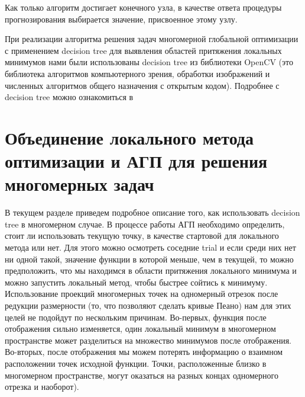 \documentclass{svproc}
\begin{document}
Как только алгоритм достигает конечного узла, в качестве ответа процедуры прогнозирования выбирается значение, присвоенное этому узлу.

При реализации алгоритма  решения задач многомерной глобальной оптимизации с применением decision tree для выявления областей притяжения локальных минимумов нами были использованы  decision tree из библиотеки OpenCV (это библиотека алгоритмов компьютерного зрения, обработки изображений и численных алгоритмов общего назначения с открытым кодом). Подробнее с decision tree можно ознакомиться в \cite{fio_bib16}


\section{Объединение локального метода оптимизации и АГП для решения многомерных задач}

В текущем разделе приведем подробное описание того, как использовать decision tree в многомерном случае. В процессе работы АГП необходимо определить, стоит ли использовать текущую точку, в качестве стартовой для локального метода или нет. Для этого можно осмотреть соседние trial и если среди них нет ни одной такой, значение функции в которой меньше, чем в текущей, то можно предположить, что мы находимся в области притяжения локального минимума и можно запустить локальный метод, чтобы быстрее сойтись к минимуму. Использование проекций многомерных точек на одномерный отрезок после редукции размерности (то, что позволяют сделать кривые Пеано) нам для этих целей не подойдут по нескольким причинам. Во-первых, функция после отображения сильно изменяется, один локальный минимум в многомерном пространстве может разделиться на множество минимумов после отображения. Во-вторых, после отображения мы можем потерять информацию о взаимном расположении точек исходной функции. Точки, расположенные близко в многомерном пространстве, могут оказаться на разных концах одномерного отрезка и наоборот).
\end{document}
